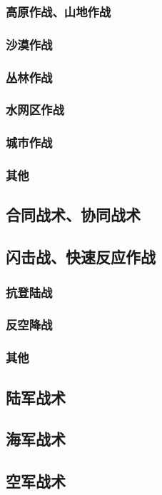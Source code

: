 \documentclass[UTF8]{../ApplicationUniverse}
\begin{document}
        \subsubsection{高原作战、山地作战}
        \subsubsection{沙漠作战}
        \subsubsection{丛林作战}
        \subsubsection{水网区作战}
        \subsubsection{城市作战}
        \subsubsection{其他}
    \subsection{合同战术、协同战术}
    \subsection{闪击战、快速反应作战}
        \subsubsection{抗登陆战}
        \subsubsection{反空降战}
        \subsubsection{其他}
    \subsection{陆军战术}
    \subsection{海军战术}
    \subsection{空军战术}
\end{document}
